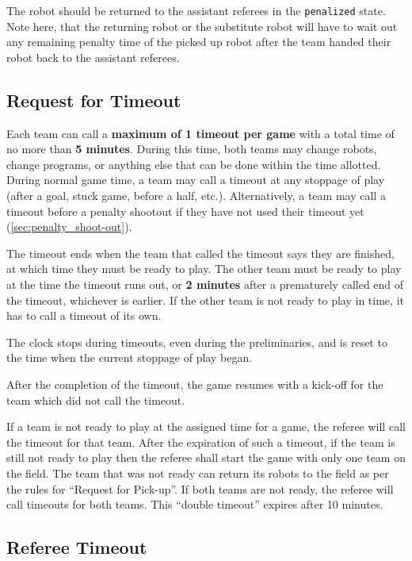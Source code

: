 The robot should be returned to the assistant referees in the \texttt{penalized} state.
Note here, that the returning robot or the substitute robot will have to wait out any remaining penalty time of the picked up robot after the team handed their robot back to the assistant referees.

\subsection{Request for Timeout}
\label{sec:request_for_timeout}

Each team can call a \textbf{maximum of 1 timeout per game} with a total time of no more than \textbf{5 minutes}.
During this time, both teams may change robots, change programs, or anything else that can be done within the time allotted.
During normal game time, a team may call a timeout at any stoppage of play (after a goal, stuck game, before a half, etc.).
Alternatively, a team may call a timeout before a penalty shootout if they have not used their timeout yet (\cf \cref{sec:penalty_shoot-out}).

The timeout ends when the team that called the timeout says they are finished, at which time they must be ready to play.
The other team must be ready to play at the time the timeout runs out, or \textbf{2 minutes} after a prematurely called end of the timeout, whichever is earlier.
If the other team is not ready to play in time, it has to call a timeout of its own.

The clock stops during timeouts, even during the preliminaries, and is reset to the time when the current stoppage of play began.

After the completion of the timeout, the game resumes with a kick-off for the team which did not call the timeout.

If a team is not ready to play at the assigned time for a game, the referee will call the timeout for that team.
After the expiration of such a timeout, if the team is still not ready to play then the referee shall start the game with only one team on the field.
The team that was not ready can return its robots to the field as per the rules for ``Request for Pick-up''.
If both teams are not ready, the referee will call timeouts for both teams.
This ``double timeout'' expires after 10 minutes.

\subsection{Referee Timeout}
\label{sec:referee_timeout}

